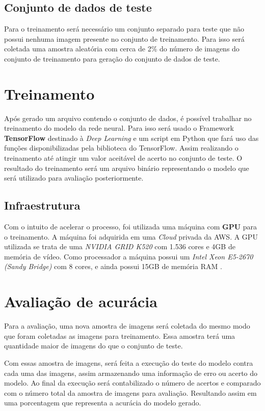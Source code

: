 \subsection{Conjunto de dados de teste}

Para o treinamento será necessário um conjunto separado para teste que
não possui nenhuma imagem presente no conjunto de treinamento. Para
isso será coletada uma amostra aleatória com cerca de 2\% do número de
imagens do conjunto de treinamento para geração do conjunto de dados
de teste.

\section{Treinamento}

Após gerado um arquivo contendo o conjunto de dados, é possível
trabalhar no treinamento do modelo da rede neural. Para isso será
usado o Framework {\bf TensorFlow}\cite{TensorFlow} destinado à
\textit{Deep Learning} e um script em Python que fará uso das funções
disponibilizadas pela biblioteca do TensorFlow. Assim realizando o
treinamento até atingir um valor aceitável de acerto no conjunto de
teste. O resultado do treinamento será um arquivo binário
representando o modelo que será utilizado para avaliação
posteriormente.

\subsection{Infraestrutura}

Com o intuito de acelerar o processo, foi utilizada uma
máquina com {\bf GPU} para o treinamento. A máquina foi adquirida em
uma \textit{Cloud} privada da AWS. A GPU utilizada se trata de uma
\textit{NVIDIA GRID K520} com 1.536 cores e 4GB de memória de vídeo. Como
processador a máquina possui um \textit{Intel Xeon E5-2670 (Sandy
  Bridge)} com 8 cores, e ainda possui 15GB de memória RAM
\cite{AWSGPU}\cite{GPUinstance}.

\section{Avaliação de acurácia}

Para a avaliação, uma nova amostra de imagens será coletada do mesmo
modo que foram coletadas as imagens para treinamento. Essa amostra
terá uma quantidade maior de imagens do que o conjunto de teste.

Com essas amostra de imagens, será feita a execução do teste do modelo
contra cada uma das imagens, assim armazenando uma informação de erro
ou acerto do modelo. Ao final da execução será contabilizado o número
de acertos e comparado com o número total da amostra de imagens para
avaliação. Resultando assim em uma porcentagem que representa a
acurácia do modelo gerado.

